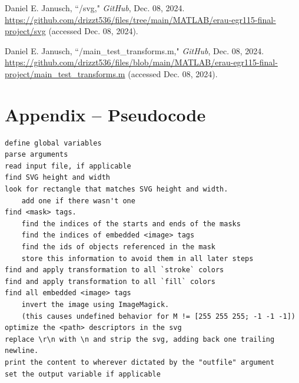 \documentclass[12pt]{article}
\begin{document}
\vspace{-20px}
\begin{enumerate}[label={[7]}]
	\item Daniel E. Janusch, ``/svg," {\it GitHub}, Dec. 08, 2024.
	\url{https://github.com/drizzt536/files/tree/main/MATLAB/erau-egr115-final-project/svg}
	(accessed Dec. 08, 2024).
	\label{svg folder}
\end{enumerate}
\vspace{-20px}
\begin{enumerate}[label={[8]}]
	\item Daniel E. Janusch, ``/main\_test\_transforms.m," {\it GitHub}, Dec. 08, 2024.
	\url{https://github.com/drizzt536/files/blob/main/MATLAB/erau-egr115-final-project/main_test_transforms.m}
	(accessed Dec. 08, 2024).
	\label{tfm tests}
\end{enumerate}

\pagebreak
\section{Appendix {\bf–} Pseudocode}

\begin{verbatim}
define global variables
parse arguments
read input file, if applicable
find SVG height and width
look for rectangle that matches SVG height and width.
    add one if there wasn't one
find <mask> tags.
    find the indices of the starts and ends of the masks
    find the indices of embedded <image> tags
    find the ids of objects referenced in the mask
    store this information to avoid them in all later steps
find and apply transformation to all `stroke` colors
find and apply transformation to all `fill` colors
find all embedded <image> tags
    invert the image using ImageMagick.
    (this causes undefined behavior for M != [255 255 255; -1 -1 -1])
optimize the <path> descriptors in the svg
replace \r\n with \n and strip the svg, adding back one trailing newline.
print the content to wherever dictated by the "outfile" argument
set the output variable if applicable
\end{verbatim}
\end{document}
